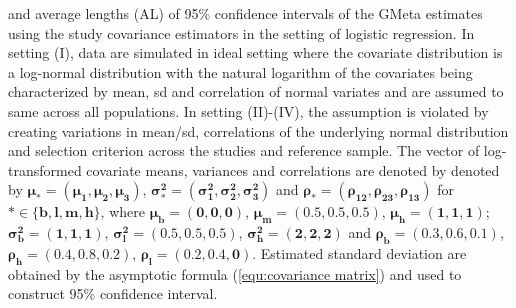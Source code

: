 \documentclass[lineno]{biometrika}
\begin{document}
\begin{table}
\begin{tabnote}
and average lengths (AL)
of 95\% confidence intervals of the GMeta estimates using the study covariance estimators in the setting of logistic regression. In setting (I), data are simulated in ideal setting where the covariate distribution is a log-normal distribution with the natural logarithm of the covariates being characterized by mean, sd and correlation of normal variates and are assumed to same across all populations. In setting (II)-(IV), the assumption is violated by creating variations in mean/sd, correlations of the underlying normal distribution and selection criterion across the studies and reference sample. The vector of log-transformed covariate means, variances and correlations are denoted by denoted by $\boldsymbol{\mu_*  = (\mu_1,\mu_2,\mu_3)}$, $\boldsymbol{\sigma^2_*  = (\sigma_1^2,\sigma_2^2, \sigma_3^2)}$ and $\boldsymbol{\rho_*  = (\rho_{12},\rho_{23},\rho_{13})}$ for $\boldsymbol{* \in \{b,l,m,h\}}$, where $\boldsymbol{\mu_b = (0,0,0)}$, $\boldsymbol{\mu_m = (0.5,0.5,0.5)}$, $\boldsymbol{\mu_h = (1,1,1)}$; $\boldsymbol{\sigma_b^2 = (1,1,1)}$, $\boldsymbol{\sigma_l^2 = (0.5,0.5,0.5)}$, $\boldsymbol{\sigma_h^2 = (2,2,2)}$ and $\boldsymbol{\rho_b = (0.3,0.6,0.1)}$, $\boldsymbol{\rho_h = (0.4,0.8,0.2)}$, $\boldsymbol{\rho_l = (0.2,0.4,0)}$. Estimated standard deviation are obtained by the asymptotic formula (\ref{equ:covariance matrix}) and used to construct 95\% confidence interval.
\end{tabnote}
\end{table}
\end{document}
